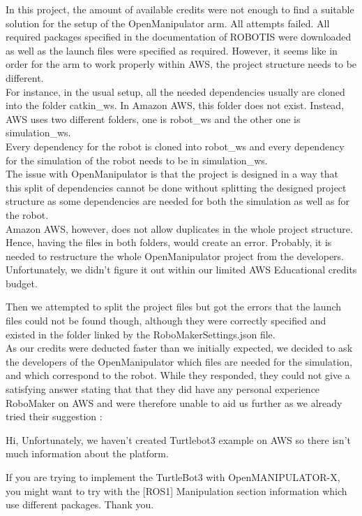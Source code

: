 \documentclass[plainarticle,zihtitle,english,final,hyperref,utf8]{zihpub}
\begin{document}
\newline
In this project, the amount of available credits were not enough to find a suitable solution for the setup of the OpenManipulator arm. All attempts failed. All required packages specified in the documentation of ROBOTIS were downloaded as well as the launch files were specified as required. However, it seems like in order for the arm to work properly within AWS, the project structure needs to be different.\\
\newline
For instance, in the usual setup, all the needed dependencies usually are cloned into the folder catkin\_ws. In Amazon AWS, this folder does not exist. Instead, AWS uses two different folders, one is robot\_ws and the other one is simulation\_ws. \\
Every dependency for the robot is cloned into robot\_ws and every dependency for the simulation of the robot needs to be in simulation\_ws.\\
The issue with OpenManipulator is that the project is designed in a way that this split of dependencies cannot be done without splitting the designed project structure as some dependencies are needed for both the simulation as well as for the robot.\\
Amazon AWS, however, does not allow duplicates in the whole project structure. Hence, having the files in both folders, would create an error. Probably, it is needed to restructure the whole OpenManipulator project from the developers. Unfortunately, we didn't figure it out within our limited AWS Educational credits budget.\\
\newline

Then we attempted to split the project files but got the errors that the launch files could not be found though, although they were correctly specified and existed in the folder linked by the RoboMakerSettings.json file.\\
As our credits were deducted faster than we initially expected, we decided to ask the developers of the OpenManipulator which files are needed for the simulation, and which correspond to the robot. While they responded, they could not give a satisfying answer stating that that they did have any personal experience RoboMaker on AWS and were therefore unable to aid us further as we already tried their suggestion \cite{robotisforumaws}:
\newline
\begin{displayquote}
Hi,
Unfortunately, we haven't created Turtlebot3 example on AWS so there isn't much information about the platform.

If you are trying to implement the TurtleBot3 with OpenMANIPULATOR-X, you might want to try with the [ROS1] Manipulation section information which use different packages.
Thank you.
\end{displayquote}
\end{document}
